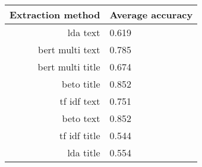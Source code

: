 \begin{tabular}{|r|l|}
  \hline
  Extraction method & Average accuracy \\ 
  \hline
  lda text & 0.619 \\ 
  \hline
  bert multi text & 0.785 \\ 
  \hline
  bert multi title & 0.674 \\ 
  \hline
  beto title & 0.852 \\ 
  \hline
  tf idf text & 0.751 \\ 
  \hline
  beto text & 0.852 \\ 
  \hline
  tf idf title & 0.544 \\ 
  \hline
  lda title & 0.554 \\ 
  \hline
\end{tabular}

